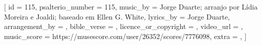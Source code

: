 
[
    id                     = {115},
    psalterio_number       = {115},
    music_by               = {Jorge Duarte; arranjo por Lídia Moreira e Joaldi; baseado em Ellen G. White},
    lyrics_by              = {Jorge Duarte},
    arrangement_by         = {},
    bible_verse            = {},
    licence_or_copyright   = {},
    video_url              = {},
    music_score            = {https://musescore.com/user/26352/scores/7776098},
    extra                  = {},
]


\beginverse

